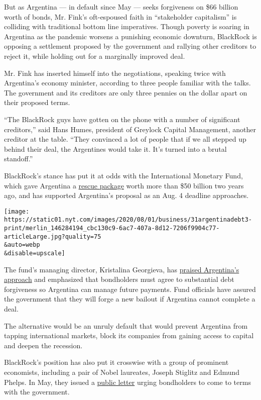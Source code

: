 But as Argentina --- in default since May --- seeks forgiveness on \$66
billion worth of bonds, Mr. Fink's oft-espoused faith in ``stakeholder
capitalism'' is colliding with traditional bottom line imperatives.
Though poverty is soaring in Argentina as the pandemic worsens a
punishing economic downturn, BlackRock is opposing a settlement proposed
by the government and rallying other creditors to reject it, while
holding out for a marginally improved deal.

Mr. Fink has inserted himself into the negotiations, speaking twice with
Argentina's economy minister, according to three people familiar with
the talks. The government and its creditors are only three pennies on
the dollar apart on their proposed terms.

``The BlackRock guys have gotten on the phone with a number of
significant creditors,'' said Hans Humes, president of Greylock Capital
Management, another creditor at the table. ``They convinced a lot of
people that if we all stepped up behind their deal, the Argentines would
take it. It's turned into a brutal standoff.''

BlackRock's stance has put it at odds with the International Monetary
Fund, which gave Argentina a
\href{https://www.nytimes.com/2018/06/07/business/argentina-imf-debt.html}{rescue
package} worth more than \$50 billion two years ago, and has supported
Argentina's proposal as an Aug. 4 deadline approaches.

\texttt{[image: https://static01.nyt.com/images/2020/08/01/business/31argentinadebt3-print/merlin\_146284194\_cbc130c9-6ac7-407a-8d12-7206f9904c77-articleLarge.jpg?quality=75\\\&auto=webp\\\&disable=upscale]}

The fund's managing director, Kristalina Georgieva, has
\href{https://www.imf.org/en/News/Articles/2020/02/04/pr2034-statement-by-imf-managing-director-kristalina-georgieva-on-argentina}{praised
Argentina's approach} and emphasized that bondholders must agree to
substantial debt forgiveness so Argentina can manage future payments.
Fund officials have assured the government that they will forge a new
bailout if Argentina cannot complete a deal.

The alternative would be an unruly default that would prevent Argentina
from tapping international markets, block its companies from gaining
access to capital and deepen the recession.

BlackRock's position has also put it crosswise with a group of prominent
economists, including a pair of Nobel laureates, Joseph Stiglitz and
Edmund Phelps. In May, they issued a
\href{https://www.reuters.com/article/us-argentina-bonds-economists/nobelist-stiglitz-economists-from-20-countries-back-argentina-in-debt-showdown-idUSKBN22I2V1?il=0}{public
letter} urging bondholders to come to terms with the government.

